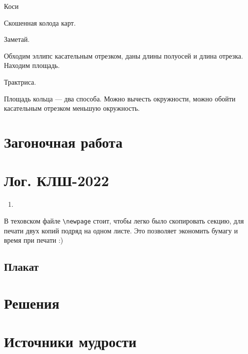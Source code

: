 \documentclass[12pt]{article}
\newcounter{problem}[section]
\theoremstyle{definition}
\begin{document}
Коси

Скошенная колода карт.

Заметай.

Обходим эллипс касательным отрезком, даны длины полуосей и длина отрезка. Находим площадь.

Трактриса. 

Площадь кольца — два способа. Можно вычесть окружности, можно обойти касательным отрезком меньшую окружность. 


\section{Загоночная работа}




\newpage

\section{Лог. КЛШ-2022}

\begin{enumerate}
  \item 
\end{enumerate}

В теховском файле \verb|\newpage| стоит, чтобы легко было скопировать секцию, для печати двух копий подряд на одном листе.
Это позволяет экономить бумагу и время при печати :)

\subsection{Плакат}






\renewenvironment{solution}[1]{%
         \vskip .5cm plus 2cm minus 0.1cm%
         {\bfseries \hyperlink{problem:#1}{#1.}}%
}%
{%
}%



\section{Решения}



\section{Источники мудрости}
\end{document}
